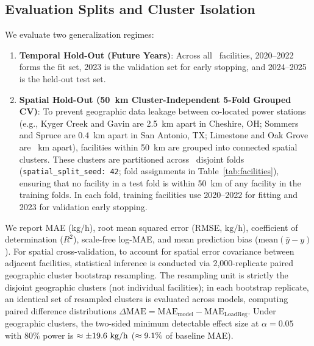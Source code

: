 \documentclass[conference]{IEEEtran}
\begin{document}
\subsection{Evaluation Splits and Cluster Isolation}
We evaluate two generalization regimes:
\begin{enumerate}
    \item \textbf{Temporal Hold-Out (Future Years)}: Across all \NFacilities~facilities, 2020--2022 forms the fit set, 2023 is the validation set for early stopping, and 2024--2025 is the held-out test set.
    \item \textbf{Spatial Hold-Out (50~km Cluster-Independent 5-Fold Grouped CV)}: To prevent geographic data leakage between co-located power stations (e.g., Kyger Creek and Gavin are 2.5~km apart in Cheshire, OH; Sommers and Spruce are 0.4~km apart in San Antonio, TX; Limestone and Oak Grove are \MaxClusterDistKm{}~km apart), facilities within 50~km are grouped into \NClusters{} connected spatial clusters. These clusters are partitioned across \NFolds~disjoint folds (\texttt{spatial\_split\_seed: 42}; fold assignments in Table~\ref{tab:facilities}), ensuring that no facility in a test fold is within 50~km of any facility in the training folds. In each fold, training facilities use 2020--2022 for fitting and 2023 for validation early stopping.
\end{enumerate}
We report MAE ($\text{kg/h}$), root mean squared error (RMSE, $\text{kg/h}$), coefficient of determination ($R^2$), scale-free log-MAE, and mean prediction bias ($\text{mean}(\hat{y} - y)$). For spatial cross-validation, to account for spatial error covariance between adjacent facilities, statistical inference is conducted via 2,000-replicate paired geographic cluster bootstrap resampling. The resampling unit is strictly the \NClusters{} disjoint geographic clusters (not individual facilities); in each bootstrap replicate, an identical set of resampled clusters is evaluated across models, computing paired difference distributions $\Delta\text{MAE} = \text{MAE}_{\text{model}} - \text{MAE}_{\text{LoadReg}}$. Under \NClusters{} geographic clusters, the two-sided minimum detectable effect size at $\alpha = 0.05$ with $80\%$ power is $\approx \pm 19.6\text{ kg/h}$ ($\approx 9.1\%$ of baseline MAE).
\end{document}
